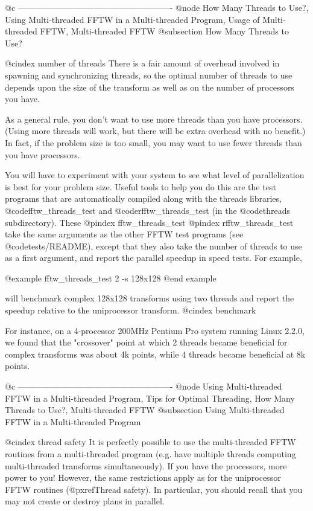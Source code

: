 @c -------------------------------------------------------
@node How Many Threads to Use?, Using Multi-threaded FFTW in a Multi-threaded Program, Usage of Multi-threaded FFTW, Multi-threaded FFTW
@subsection How Many Threads to Use?

@cindex number of threads
There is a fair amount of overhead involved in spawning and synchronizing
threads, so the optimal number of threads to use depends upon the size
of the transform as well as on the number of processors you have.

As a general rule, you don't want to use more threads than you have
processors.  (Using more threads will work, but there will be extra
overhead with no benefit.)  In fact, if the problem size is too small,
you may want to use fewer threads than you have processors.

You will have to experiment with your system to see what level of
parallelization is best for your problem size.  Useful tools to help you
do this are the test programs that are automatically compiled along with
the threads libraries, @code{fftw_threads_test} and
@code{rfftw_threads_test} (in the @code{threads} subdirectory).  These
@pindex fftw_threads_test
@pindex rfftw_threads_test
take the same arguments as the other FFTW test programs (see
@code{tests/README}), except that they also take the number of threads
to use as a first argument, and report the parallel speedup in speed
tests.  For example,

@example
fftw_threads_test 2 -s 128x128
@end example

will benchmark complex 128x128 transforms using two threads and report
the speedup relative to the uniprocessor transform.
@cindex benchmark

For instance, on a 4-processor 200MHz Pentium Pro system running Linux
2.2.0, we found that the "crossover" point at which 2 threads became
beneficial for complex transforms was about 4k points, while 4 threads
became beneficial at 8k points.

@c -------------------------------------------------------
@node Using Multi-threaded FFTW in a Multi-threaded Program, Tips for Optimal Threading, How Many Threads to Use?, Multi-threaded FFTW
@subsection Using Multi-threaded FFTW in a Multi-threaded Program

@cindex thread safety
It is perfectly possible to use the multi-threaded FFTW routines from a
multi-threaded program (e.g. have multiple threads computing
multi-threaded transforms simultaneously).  If you have the processors,
more power to you!  However, the same restrictions apply as for the
uniprocessor FFTW routines (@pxref{Thread safety}).  In particular, you
should recall that you may not create or destroy plans in parallel.

